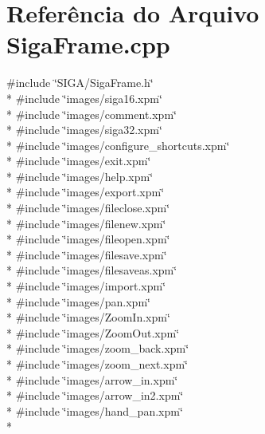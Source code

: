 \section{Referência do Arquivo Siga\+Frame.\+cpp}
\label{_siga_frame_8cpp}
{\ttfamily \#include \char`\"{}S\+I\+G\+A/\+Siga\+Frame.\+h\char`\"{}}\\*
{\ttfamily \#include \char`\"{}images/siga16.\+xpm\char`\"{}}\\*
{\ttfamily \#include \char`\"{}images/comment.\+xpm\char`\"{}}\\*
{\ttfamily \#include \char`\"{}images/siga32.\+xpm\char`\"{}}\\*
{\ttfamily \#include \char`\"{}images/configure\+\_\+shortcuts.\+xpm\char`\"{}}\\*
{\ttfamily \#include \char`\"{}images/exit.\+xpm\char`\"{}}\\*
{\ttfamily \#include \char`\"{}images/help.\+xpm\char`\"{}}\\*
{\ttfamily \#include \char`\"{}images/export.\+xpm\char`\"{}}\\*
{\ttfamily \#include \char`\"{}images/fileclose.\+xpm\char`\"{}}\\*
{\ttfamily \#include \char`\"{}images/filenew.\+xpm\char`\"{}}\\*
{\ttfamily \#include \char`\"{}images/fileopen.\+xpm\char`\"{}}\\*
{\ttfamily \#include \char`\"{}images/filesave.\+xpm\char`\"{}}\\*
{\ttfamily \#include \char`\"{}images/filesaveas.\+xpm\char`\"{}}\\*
{\ttfamily \#include \char`\"{}images/import.\+xpm\char`\"{}}\\*
{\ttfamily \#include \char`\"{}images/pan.\+xpm\char`\"{}}\\*
{\ttfamily \#include \char`\"{}images/\+Zoom\+In.\+xpm\char`\"{}}\\*
{\ttfamily \#include \char`\"{}images/\+Zoom\+Out.\+xpm\char`\"{}}\\*
{\ttfamily \#include \char`\"{}images/zoom\+\_\+back.\+xpm\char`\"{}}\\*
{\ttfamily \#include \char`\"{}images/zoom\+\_\+next.\+xpm\char`\"{}}\\*
{\ttfamily \#include \char`\"{}images/arrow\+\_\+in.\+xpm\char`\"{}}\\*
{\ttfamily \#include \char`\"{}images/arrow\+\_\+in2.\+xpm\char`\"{}}\\*
{\ttfamily \#include \char`\"{}images/hand\+\_\+pan.\+xpm\char`\"{}}\\*
